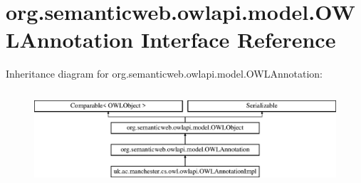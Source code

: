 \hypertarget{interfaceorg_1_1semanticweb_1_1owlapi_1_1model_1_1_o_w_l_annotation}{\section{org.\-semanticweb.\-owlapi.\-model.\-O\-W\-L\-Annotation Interface Reference}
\label{interfaceorg_1_1semanticweb_1_1owlapi_1_1model_1_1_o_w_l_annotation}
}
Inheritance diagram for org.\-semanticweb.\-owlapi.\-model.\-O\-W\-L\-Annotation\-:\begin{figure}[H]
\begin{center}
\leavevmode
\includegraphics[height=3.566879cm]{interfaceorg_1_1semanticweb_1_1owlapi_1_1model_1_1_o_w_l_annotation}
\end{center}
\end{figure}
